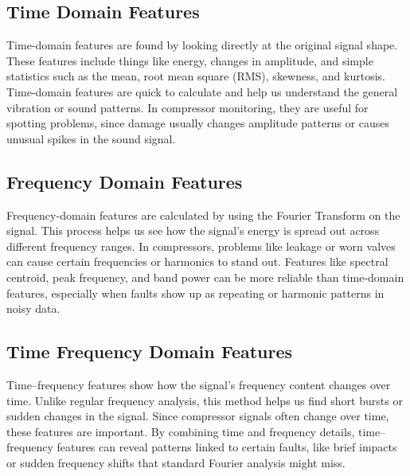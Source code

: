 \documentclass[12pt,a4paper]{article}
\begin{document}
\begin{multicols}{2}
\subsection{Time Domain Features}
Time-domain features are found by looking directly at the original signal shape. These features include things like energy, changes in amplitude, and simple statistics such as the mean, root mean square (RMS), skewness, and kurtosis. Time-domain features are quick to calculate and help us understand the general vibration or sound patterns. In compressor monitoring, they are useful for spotting problems, since damage usually changes amplitude patterns or causes unusual spikes in the sound signal.
\subsection{Frequency Domain Features}
Frequency-domain features are calculated by using the Fourier Transform on the signal. This process helps us see how the signal's energy is spread out across different frequency ranges. In compressors, problems like leakage or worn valves can cause certain frequencies or harmonics to stand out. Features like spectral centroid, peak frequency, and band power can be more reliable than time-domain features, especially when faults show up as repeating or harmonic patterns in noisy data.
\subsection{Time Frequency Domain Features}
Time–frequency features show how the signal's frequency content changes over time. Unlike regular frequency analysis, this method helps us find short bursts or sudden changes in the signal. Since compressor signals often change over time, these features are important. By combining time and frequency details, time–frequency features can reveal patterns linked to certain faults, like brief impacts or sudden frequency shifts that standard Fourier analysis might miss.

\end{multicols}
\end{document}
